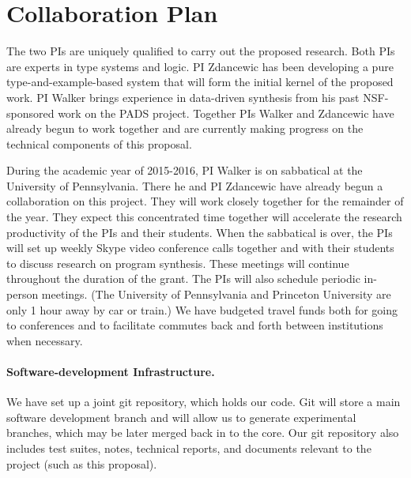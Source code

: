 \section*{Collaboration Plan}
\label{sec:timeline}

The two PIs are uniquely qualified to carry out the proposed research.
Both PIs are experts in type systems and logic.  PI Zdancewic has been
developing a pure type-and-example-based system that will form the
initial kernel of the proposed work.  PI Walker brings experience in
data-driven synthesis from his past NSF-sponsored work on the PADS
project.  Together PIs Walker and Zdancewic have already begun
to work together and are currently making progress on the technical
components of this proposal.


During the academic year of 2015-2016, PI Walker is on sabbatical at
the University of Pennsylvania.  There he and PI Zdancewic have
already begun a collaboration on this project.  They will work closely
together for the remainder of the year.  They expect this concentrated
time together will accelerate the research productivity of the PIs and
their students.  When the sabbatical is over, the PIs will set up
weekly Skype video conference calls together and with their students
to discuss research on program synthesis.  These meetings will
continue throughout the duration of the grant.  The PIs will also
schedule periodic in-person meetings.  (The University of Pennsylvania
and Princeton University are only 1 hour away by car or train.)  We
have budgeted travel funds both for going to conferences and to
facilitate commutes back and forth between institutions when
necessary.

\paragraph*{Software-development Infrastructure.}
We have set up a joint git 
repository, which holds our code.  Git will store a main software
development branch and will allow us to generate experimental branches,
which may be later merged back in to the core.  Our git repository also
includes test suites, notes, technical reports, and documents relevant 
to the project (such as this proposal).

